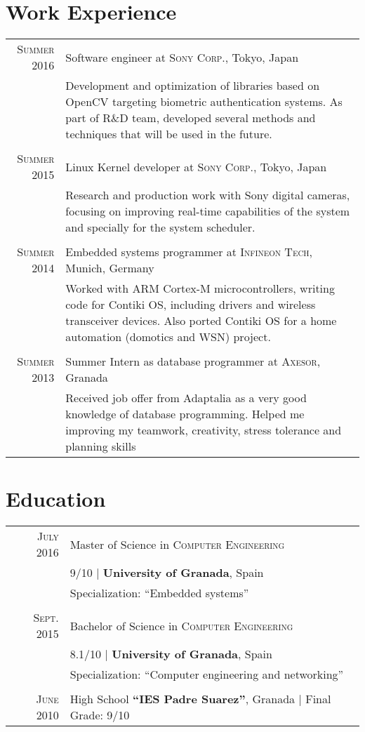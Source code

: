 \documentclass[a4paper,10pt]{article}
\begin{document}
\section{Work Experience}
\begin{tabular}{r|p{11cm}}

\textsc{Summer 2016} & Software engineer at \textsc{Sony Corp.},
Tokyo, Japan\\&\footnotesize{Development and optimization of libraries
based on OpenCV targeting biometric authentication systems. As part of R\&D
team, developed several methods and techniques that will be used in the future.}
 \\\multicolumn{2}{c}{} \\

\textsc{Summer 2015} & Linux Kernel developer at \textsc{Sony Corp.},
Tokyo, Japan\\&\footnotesize{Research and production work with Sony
digital cameras, focusing on improving real-time capabilities of
the system and specially for the system scheduler.} \\\multicolumn{2}{c}{} \\

\textsc{Summer 2014} & Embedded systems programmer at \textsc{Infineon Tech}, Munich, Germany\\&\footnotesize{Worked with ARM Cortex-M microcontrollers, writing code for Contiki OS, including drivers and wireless transceiver devices. Also ported Contiki OS for a home automation (domotics and WSN) project.} \\\multicolumn{2}{c}{} \\

\textsc{Summer 2013} & Summer Intern as database programmer at \textsc{Axesor}, Granada\\&\footnotesize{Received job offer from Adaptalia as a very good knowledge of database programming. Helped me improving my teamwork, creativity, stress tolerance and planning skills}
\end{tabular}

\section{Education}
\begin{tabular}{rl}
\textsc{July} 2016 & Master of Science in \textsc{Computer Engineering}\\
& 9/10 | \textbf{University of Granada}, Spain\\
& Specialization: ``Embedded systems'' \\\\
\textsc{Sept.} 2015& Bachelor of Science in \textsc{Computer Engineering}\\
& 8.1/10 | \textbf{University of Granada}, Spain\\
& Specialization: ``Computer engineering and networking'' \\\\
\textsc{June} 2010&  High School \textbf{``IES Padre Suarez''}, Granada | Final Grade: 9/10
\end{tabular}
\end{document}
